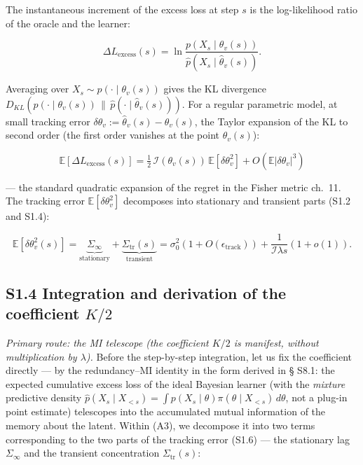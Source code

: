 \documentclass[12pt]{iopart}
\providecommand{\texorpdfstring}[2]{#1}
\providecommand{\lt}{<}\providecommand{\gt}{>}
\begin{document}
The instantaneous increment of the excess loss at step \(s\) is the log-likelihood ratio of the oracle and the learner:



\[\Delta L_{\text{excess}}(s) = \ln\frac{p(X_s\mid\theta_v(s))}{\hat p(X_s\mid\hat\theta_v(s))}.\]



Averaging over \(X_s \sim p(\cdot\mid\theta_v(s))\) gives the KL divergence \(D_{KL}(p(\cdot\mid\theta_v(s)) \,\|\, \hat p(\cdot\mid\hat\theta_v(s)))\). For a regular parametric model, at small tracking error \(\delta\theta_v := \hat\theta_v(s)-\theta_v(s)\), the Taylor expansion of the KL to second order (the first order vanishes at the point \(\theta_v(s)\)):



\begin{equation}\mathbb{E}[\Delta L_{\text{excess}}(s)] = \tfrac12\,\mathcal I(\theta_v(s))\,\mathbb{E}[\delta\theta_v^2] + O(\mathbb{E}|\delta\theta_v|^3) \tag{S1.5}\end{equation}



--- the standard quadratic expansion of the regret in the Fisher metric \cite{ClarkeBarron1990,Rissanen1986,CoverThomas2006} ch.~11. The tracking error \(\mathbb{E}[\delta\theta_v^2]\) decomposes into stationary and transient parts (S1.2 and S1.4):



\begin{equation}\mathbb{E}[\delta\theta_v^2(s)] = \underbrace{\Sigma_\infty}_{\text{stationary}} + \underbrace{\Sigma_{\text{tr}}(s)}_{\text{transient}} = \sigma_0^2(1+O(\epsilon_{\text{track}})) + \frac{1}{\mathcal I\lambda s}(1+o(1)). \tag{S1.6}\end{equation}



\subsection{\texorpdfstring{S1.4 Integration and derivation of the coefficient \(K/2\)}{S1.4 Integration and derivation of the coefficient K/2}}\label{s1.4-integration-and-derivation-of-the-coefficient-k2}



\emph{Primary route: the MI telescope (the coefficient \(K/2\) is manifest, without multiplication by \(\lambda\)).} Before the step-by-step integration, let us fix the coefficient directly --- by the redundancy--MI identity \cite{ClarkeBarron1990,Rissanen1986} in the form derived in \cite{Andriishin2026b} § S8.1: the expected cumulative excess loss of the ideal Bayesian learner (with the \emph{mixture} predictive density \(\hat p(X_s\mid X_{\lt s})=\int p(X_s\mid\theta)\pi(\theta\mid X_{\lt s})\,d\theta\), not a plug-in point estimate) telescopes into the accumulated mutual information of the memory about the latent. Within (A3), we decompose it into two terms corresponding to the two parts of the tracking error (S1.6) --- the stationary lag \(\Sigma_\infty\) and the transient concentration \(\Sigma_{\text{tr}}(s)\):
\end{document}
